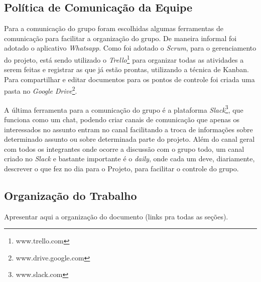 \subsection{Política de Comunicação da Equipe} %
\label{sub:política_de_comunicação_da_equipe}
	
	Para a comunicação do grupo foram escolhidas algumas ferramentas de comunicação para facilitar a organização do grupo. De maneira informal foi adotado o aplicativo \textit{Whatsapp}. Como foi adotado o \textit{Scrum}, para o gerenciamento do projeto, está sendo utilizado o \textit{Trello}\footnote{www.trello.com} para organizar todas as atividades a serem feitas e registrar as que já estão prontas, utilizando a técnica de Kanban. Para compartilhar e editar documentos para os pontos de controle foi criada uma pasta no \textit{Google Drive}\footnote{www.drive.google.com}. 

	A última ferramenta para a comunicação do grupo é a plataforma \textit{Slack}\footnote{www.slack.com}, que funciona como um chat, podendo criar canais de comunicação que apenas os interessados no assunto entram no canal facilitando a troca de informações sobre determinado assunto ou sobre determinada parte do projeto. Além do canal geral com todos os integrantes onde ocorre a discussão com o grupo todo, um canal criado no \textit{Slack} e bastante importante é o \textit{daily}, onde cada um deve, diariamente, descrever o que fez no dia para o Projeto, para facilitar o controle do grupo. 

\subsection{Organização do Trabalho} %
\label{sub:organização_do_trabalho}
	
	Apresentar aqui a organização do documento (links pra todas as seções).
